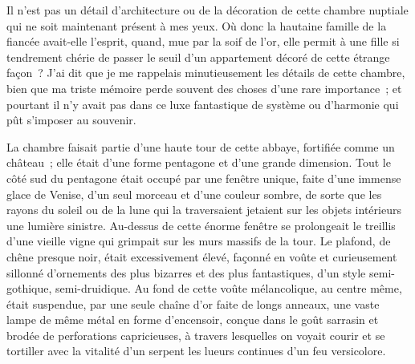 \documentclass[french,twoside]{book} %
\begin{document}
Il n’est pas un détail d’architecture ou de la décoration de cette chambre nuptiale qui ne soit maintenant présent à mes yeux. Où donc la hautaine famille de la fiancée avait-elle l’esprit, quand, mue par la soif de l’or, elle permit à une fille si tendrement chérie de passer le seuil d’un appartement décoré de cette étrange façon ? J’ai dit que je me rappelais minutieusement les détails de cette chambre, bien que ma triste mémoire perde souvent des choses d’une rare importance ; et pourtant il n’y avait pas dans ce luxe fantastique de système ou d’harmonie qui pût s’imposer au souvenir.\par
La chambre faisait partie d’une haute tour de cette abbaye, fortifiée comme un château ; elle était d’une forme pentagone et d’une grande dimension. Tout le côté sud du pentagone était occupé par une fenêtre unique, faite d’une immense glace de Venise, d’un seul morceau et d’une couleur sombre, de sorte que les rayons du soleil ou de la lune qui la traversaient jetaient sur les objets intérieurs une lumière sinistre. Au-dessus de cette énorme fenêtre se prolongeait le treillis d’une vieille vigne qui grimpait sur les murs massifs de la tour. Le plafond, de chêne presque noir, était excessivement élevé, façonné en voûte et curieusement sillonné d’ornements des plus bizarres et des plus fantastiques, d’un style semi-gothique, semi-druidique. Au fond de cette voûte mélancolique, au centre même, était suspendue, par une seule chaîne d’or faite de longs anneaux, une vaste lampe de même métal en forme d’encensoir, conçue dans le goût sarrasin et brodée de perforations capricieuses, à travers lesquelles on voyait courir et se tortiller avec la vitalité d’un serpent les lueurs continues d’un feu versicolore.\par
\end{document}
